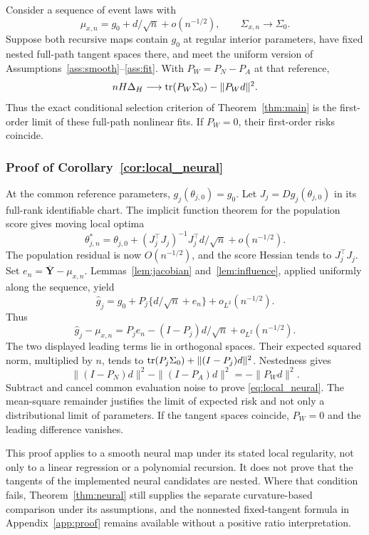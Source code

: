 \begin{corollary}
\label{cor:local_neural}
Consider a sequence of event laws with
\[
 \mu_{x,n}=g_0+d/\sqrt n+o(n^{-1/2}),\qquad
 \Sigma_{x,n}\longrightarrow\Sigma_0.
\]
Suppose both recursive maps contain $g_0$ at regular interior parameters, have fixed nested full-path tangent spaces there, and meet the uniform version of Assumptions~\ref{ass:smooth}--\ref{ass:fit}. With $P_W=P_N-P_A$ at that reference,
\begin{equation}
 nH\Delta_H\longrightarrow
       \operatorname{tr}(P_W\Sigma_0)-\|P_Wd\|^2.
 \label{eq:local_neural}
\end{equation}
Thus the exact conditional selection criterion of Theorem~\ref{thm:main} is the first-order limit of these full-path nonlinear fits. If $P_W=0$, their first-order risks coincide.
\end{corollary}

\subsubsection{Proof of Corollary~\ref{cor:local_neural}}
At the common reference parameters, $g_j(\theta_{j,0})=g_0$. Let $J_j=Dg_j(\theta_{j,0})$ in its full-rank identifiable chart. The implicit function theorem for the population score gives moving local optima
\[
 \theta_{j,n}^*=\theta_{j,0}
   +(J_j^\top J_j)^{-1}J_j^\top d/\sqrt n+o(n^{-1/2}).
\]
The population residual is now $O(n^{-1/2})$, and the score Hessian tends to $J_j^\top J_j$. Set $e_n=\overline{\mathbf Y}-\mu_{x,n}$. Lemmas~\ref{lem:jacobian} and~\ref{lem:influence}, applied uniformly along the sequence, yield
\[
 \widehat g_j=g_0+P_j\{d/\sqrt n+e_n\}
                         +o_{L^2}(n^{-1/2}).
\]
Thus
\[
 \widehat g_j-\mu_{x,n}
 =P_je_n-(I-P_j)d/\sqrt n+o_{L^2}(n^{-1/2}).
\]
The two displayed leading terms lie in orthogonal spaces. Their expected squared norm, multiplied by $n$, tends to $\operatorname{tr}(P_j\Sigma_0)+\|(I-P_j)d\|^2$. Nestedness gives
\[
 \|(I-P_N)d\|^2-\|(I-P_A)d\|^2=-\|P_Wd\|^2.
\]
Subtract and cancel common evaluation noise to prove \eqref{eq:local_neural}. The mean-square remainder justifies the limit of expected risk and not only a distributional limit of parameters. If the tangent spaces coincide, $P_W=0$ and the leading difference vanishes.

This proof applies to a smooth neural map under its stated local regularity, not only to a linear regression or a polynomial recursion. It does not prove that the tangents of the implemented neural candidates are nested. Where that condition fails, Theorem~\ref{thm:neural} still supplies the separate curvature-based comparison under its assumptions, and the nonnested fixed-tangent formula in Appendix~\ref{app:proof} remains available without a positive ratio interpretation.

